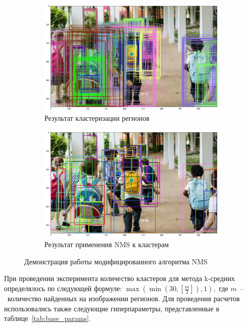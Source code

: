 \documentclass[a4paper,14pt]{article}
\begin{document}
    \begin{figure}[H]
    	\centering
    	\begin{subfigure}{.5\textwidth}
    		\centering
    		\includegraphics[width=\linewidth]{images/before_nms}
    		\caption{Результат кластеризации регионов}
    		\label{fig:nms1}
    	\end{subfigure}%
    	\begin{subfigure}{.5\textwidth}
    		\centering
    		\includegraphics[width=\linewidth]{images/after_nms}
    		\caption{Результат применения NMS к кластерам}
    		\label{fig:nms2}
    	\end{subfigure}
    	\caption{Демонстрация работы модифицированного алгоритма NMS}
    	\label{fig:nms}
    \end{figure}
    
    При проведении эксперимента количество кластеров для метода k-средних определялось по следующей формуле:
    $\max(\min(30, \left[\frac{m}{2}\right]), 1),$ где $m$~--~количество найденных на изображении регионов. 
    Для проведения расчетов использовались также следующие гиперпараметры, представленные в таблице~\ref{tab:base_params}.
    
\end{document}
